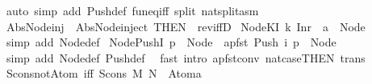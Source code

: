 \begin{isabellebody}
%
\isadelimproof
%
\endisadelimproof
%
\isatagproof
{}\isamarkupfalse%
\ {\isacharparenleft}auto\ simp\ add{\isacharcolon}\ Push{\isacharunderscore}def\ fun{\isacharunderscore}eq{\isacharunderscore}iff\ split{\isacharcolon}\ nat{\isachardot}split{\isacharunderscore}asm{\isacharparenright}%
\endisatagproof
{\isafoldproof}%
%
\isadelimproof
\isanewline
%
\endisadelimproof
\isanewline
{}\isamarkupfalse%
\ Abs{\isacharunderscore}Node{\isacharunderscore}inj\ {\isacharequal}\ Abs{\isacharunderscore}Node{\isacharunderscore}inject\ {\isacharbrackleft}THEN\ {\isacharbrackleft}{}{\isacharbrackright}\ rev{\isacharunderscore}iffD{}{\isacharbrackright}\isanewline
\isanewline
\isanewline
\isanewline
\isanewline
{}\isamarkupfalse%
\ Node{\isacharunderscore}K{}{\isacharunderscore}I{\isacharcolon}\ {\isachardoublequoteopen}{\isacharparenleft}{\isasymlambda}k{\isachardot}\ Inr\ {}{\isacharcomma}\ a{\isacharparenright}\ {\isasymin}\ Node{\isachardoublequoteclose}\isanewline
%
\isadelimproof
%
\endisadelimproof
%
\isatagproof
{}\isamarkupfalse%
\ {\isacharparenleft}simp\ add{\isacharcolon}\ Node{\isacharunderscore}def{\isacharparenright}%
\endisatagproof
{\isafoldproof}%
%
\isadelimproof
\isanewline
%
\endisadelimproof
\isanewline
{}\isamarkupfalse%
\ Node{\isacharunderscore}Push{\isacharunderscore}I{\isacharcolon}\ {\isachardoublequoteopen}p\ {\isasymin}\ Node\ {\isasymLongrightarrow}\ apfst\ {\isacharparenleft}Push\ i{\isacharparenright}\ p\ {\isasymin}\ Node{\isachardoublequoteclose}\isanewline
%
\isadelimproof
%
\endisadelimproof
%
\isatagproof
{}\isamarkupfalse%
\ {\isacharparenleft}simp\ add{\isacharcolon}\ Node{\isacharunderscore}def\ Push{\isacharunderscore}def{\isacharparenright}\ \isanewline
{}\isamarkupfalse%
\ {\isacharparenleft}fast\ intro{\isacharbang}{\isacharcolon}\ apfst{\isacharunderscore}conv\ nat{\isachardot}case{\isacharparenleft}{}{\isacharparenright}{\isacharbrackleft}THEN\ trans{\isacharbrackright}{\isacharparenright}\isanewline
{}\isamarkupfalse%
%
\endisatagproof
{\isafoldproof}%
%
\isadelimproof
%
\endisadelimproof
%
\isadelimdocument
%
\endisadelimdocument
%
\isatagdocument
%
\isamarkuptrue%
%
\endisatagdocument
{\isafolddocument}%
%
\isadelimdocument
%
\endisadelimdocument
{}\isamarkupfalse%
\ Scons{\isacharunderscore}not{\isacharunderscore}Atom\ {\isacharbrackleft}iff{\isacharbrackright}{\isacharcolon}\ {\isachardoublequoteopen}Scons\ M\ N\ {\isasymnoteq}\ Atom{\isacharparenleft}a{\isacharparenright}{\isachardoublequoteclose}\isanewline

\end{isabellebody}
